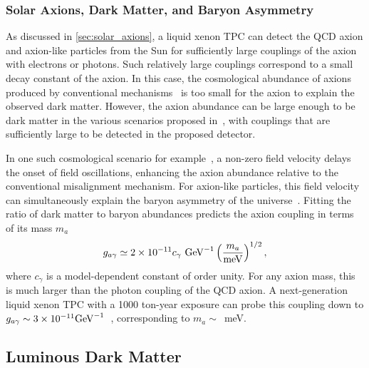 \subsubsection{Solar Axions, Dark Matter, and Baryon Asymmetry}

As discussed in \autoref{sec:solar_axions}, a liquid xenon TPC can detect the QCD axion and axion-like particles from the Sun for sufficiently large couplings of the axion with electrons or photons. Such relatively large couplings correspond to a small decay constant of the axion. In this case, the cosmological abundance of axions produced by conventional mechanisms~\cite{Abbott:1982af,Dine:1982ah,Preskill:1982cy,Davis:1986xc} is too small for the axion to explain the observed dark matter. However, the axion abundance can be large enough to be dark matter in the various scenarios proposed in~\cite{Sikivie:1982qv,Visinelli:2009kt,Hiramatsu:2010yn,Co:2017mop,Co:2018mho,Co:2019jts,Hook:2019hdk}, with couplings that are sufficiently large to be detected in the proposed detector. 

In one such cosmological scenario for example~\cite{Co:2019jts}, a non-zero field velocity delays the onset of field oscillations, enhancing the axion abundance relative to the conventional misalignment mechanism. For axion-like particles, this field velocity can simultaneously explain the baryon asymmetry of the universe~\cite{Co:2020xlh}. Fitting the ratio of dark matter to baryon abundances predicts the axion coupling in terms of its mass $m_a$
\begin{equation}
g_{a \gamma} \simeq 2\times 10^{-11}c_\gamma~{\rm GeV}^{-1} \left(\frac{m_a}{\rm meV}\right)^{1/2},
\end{equation}
where $c_\gamma$ is a model-dependent constant of order unity. For any axion mass, this is much larger than the photon coupling of the QCD axion. A next-generation liquid xenon TPC with a 1000 ton-year exposure can probe this coupling down to $g_{a\gamma}\sim 3 \times 10^{-11} {\rm GeV}^{-1}$~\cite{Dent:2020jhf}, corresponding to $m_a \sim$~meV.

\subsection{Luminous Dark Matter}\label{sec:lumidm}

